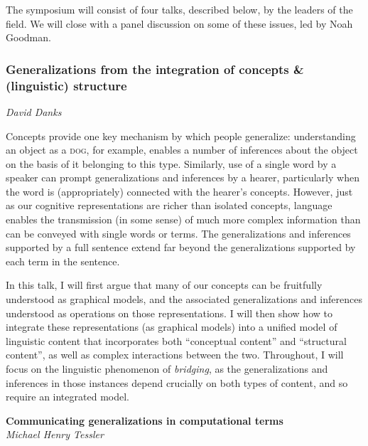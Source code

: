 \documentclass[10pt,letterpaper]{article}
\begin{document}
The symposium will consist of four talks, described below, by the leaders of the field.
We will close with a panel discussion on some of these issues, led by Noah Goodman.

\subsubsection{Generalizations from the integration of concepts \& (linguistic) structure}
\noindent\emph{David Danks}

Concepts provide one key mechanism by which people generalize: understanding an object as a \textsc{dog}, for example, enables a number of inferences about the object on the basis of it belonging to this type. 
Similarly, use of a single word by a speaker can prompt generalizations and inferences by a hearer, particularly when the word is (appropriately) connected with the hearer's concepts. 
However, just as our cognitive representations are richer than isolated concepts, language enables the transmission (in some sense) of much more complex information than can be conveyed with single words or terms. 
The generalizations and inferences supported by a full sentence extend far beyond the generalizations supported by each term in the sentence. 

In this talk, I will first argue that many of our concepts can be fruitfully understood as graphical models, and the associated generalizations and inferences understood as operations on those representations. 
I will then show how to integrate these representations (as graphical models) into a unified model of linguistic content that incorporates both ``conceptual content'' and ``structural content'', as well as complex interactions between the two. 
Throughout, I will focus on the linguistic phenomenon of \emph{bridging}, as the generalizations and inferences in those instances depend crucially on both types of content, and so require an integrated model.

\noindent\textbf{Communicating generalizations in computational terms} \\
\noindent\emph{Michael Henry Tessler}

\end{document}
